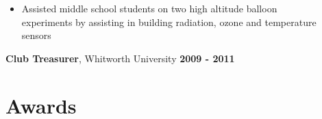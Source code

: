 \documentclass[margin]{res}
\begin{document}
\begin{resume}
\begin{itemize}
    \item[] Assisted middle school students on two high altitude balloon \\experiments by assisting in building radiation, ozone and temperature \\sensors
    \end{itemize}\vspace{-12pt}
{\bf Club Treasurer}, Whitworth University \hfill {\bf2009 - 2011}






\section{Awards}


\end{resume}
\end{document}
